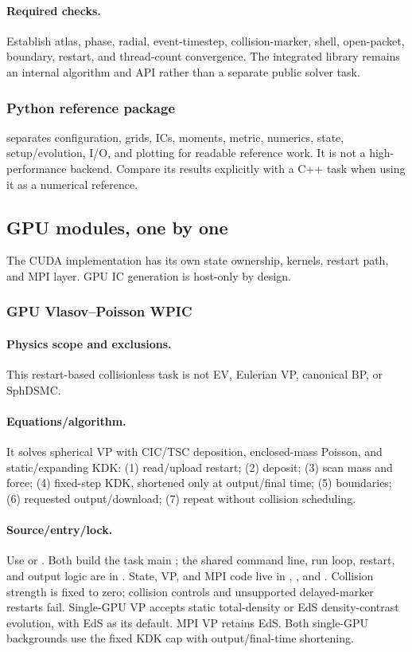 \paragraph{Required checks.}
Establish atlas, phase, radial, event-timestep, collision-marker, shell,
open-packet, boundary, restart, and thread-count convergence.  The integrated
 library remains an internal algorithm
and API rather than a separate public solver task.

\subsubsection{Python reference package}
 separates configuration, grids, ICs, moments,
metric, numerics, state, setup/evolution, I/O, and plotting for readable
reference work.  It is not a high-performance backend.  Compare its results
explicitly with a C++ task when using it as a numerical reference.

\subsection{GPU modules, one by one}

The CUDA implementation has its own state ownership, kernels, restart path,
and MPI layer.  GPU IC generation is host-only by design.

\subsubsection{GPU Vlasov--Poisson WPIC}
\paragraph{Physics scope and exclusions.}
This restart-based collisionless task is not EV, Eulerian
VP, canonical BP, or SphDSMC.
\paragraph{Equations/algorithm.}
It solves spherical VP with CIC/TSC deposition, enclosed-mass Poisson, and
static/expanding KDK: (1) read/upload restart; (2) deposit; (3) scan mass and
force; (4) fixed-step KDK, shortened only at output/final time; (5) boundaries;
(6) requested output/download; (7) repeat without collision scheduling.
\paragraph{Source/entry/lock.}
Use  or
.  Both build the task main
; the shared command line, run
loop, restart, and output logic are in
.  State, VP, and MPI code live in
, , and
.  Collision strength is fixed to zero; collision controls
and unsupported delayed-marker restarts fail. Single-GPU VP accepts
static total-density or EdS density-contrast evolution, with EdS as its default.
MPI VP retains EdS. Both single-GPU backgrounds use the fixed KDK cap with
output/final-time shortening.
